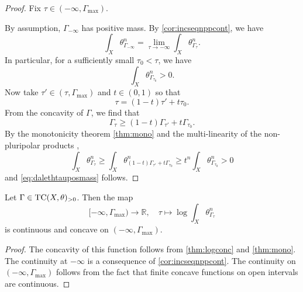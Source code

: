 \begin{proof}

    Fix $\tau\in (-\infty,\Gamma_{\max})$.

    By assumption, $\Gamma_{-\infty}$ has positive mass. By \cref{cor:incseqnppcont}, we have
    \[
    \int_X \theta_{\Gamma_{-\infty}}^n=\lim_{\tau\to -\infty}\int_X \theta_{\Gamma_{\tau}}^n.
    \]
    In particular, for a sufficiently small $\tau_0<\tau$, we have
    \[
    \int_X \theta_{\Gamma_{\tau_0}}^n>0.
    \]
    Now take $\tau'\in (\tau, \Gamma_{\max})$ and $t\in (0,1)$ so that
    \[
    \tau=(1-t)\tau'+t\tau_0.
    \]
    From the concavity of $\Gamma$, we find that
    \[
    \Gamma_{\tau}\geq (1-t)\Gamma_{\tau'}+t\Gamma_{\tau_0}.
    \]
    By the monotonicity theorem \cref{thm:mono} and the multi-linearity of the non-pluripolar products ,
    \[
    \int_X \theta_{\Gamma_{\tau}}^n\geq \int_X \theta_{(1-t)\Gamma_{\tau'}+t\Gamma_{\tau_0}}^n\geq t^n \int_X \theta_{\Gamma_{\tau_0}}^n>0
    \]
    and \eqref{eq:dalethtauposmass} follows.
\end{proof}

\begin{proposition}\label{prop:testcurvmasslogconc}
    Let $\Gamma\in \mathrm{TC}(X,\theta)_{>0}$. Then the map
    \[
    [-\infty,\Gamma_{\max})\rightarrow \mathbb{R},\quad \tau\mapsto \log \int_X \theta_{\Gamma_{\tau}}^n
    \]
    is continuous and concave on $(-\infty,\Gamma_{\max})$.
\end{proposition}
\begin{proof}
    The concavity of this function follows from \cref{thm:logconc} and \cref{thm:mono}. The continuity at $-\infty$ is a consequence of \cref{cor:incseqnppcont}.
    The continuity on $(-\infty,\Gamma_{\max})$ follows from the fact that finite concave functions on open intervals are continuous.
\end{proof}

